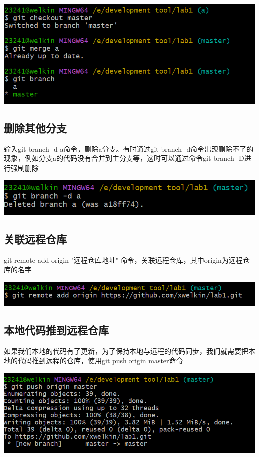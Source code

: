 \documentclass[UTF8,a4paper]{ctexart}
\begin{document}
\begin{sloppypar}
	\includegraphics[width = 16cm]{8}
	
	\subsection{删除其他分支}
	输入git branch -d a命令，删除a分支。有时通过git branch -d命令出现删除不了的现象，例如分支a的代码没有合并到主分支等，这时可以通过命令git branch -D进行强制删除
	
	\includegraphics[width = 16cm]{9}
	
	\subsection{关联远程仓库}
	git remote add origin "远程仓库地址" 命令，关联远程仓库，其中origin为远程仓库的名字
	
	\includegraphics[width = 16cm]{10}
	
	\subsection{本地代码推到远程仓库}
	如果我们本地的代码有了更新，为了保持本地与远程的代码同步，我们就需要把本地的代码推到远程的仓库，使用git push origin master命令
	
	\includegraphics[width = 16cm]{11}
	

\end{sloppypar}
\end{document}
